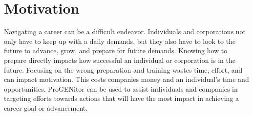 \section{Motivation}
\label{sect:motivation}
Navigating a career can be a difficult endeavor.  Individuals and corporations
not only have to keep up with a daily demands, but they also have to look to the
future to advance, grow, and prepare for future demands.  Knowing how to prepare
directly impacts how successful an individual or corporation is in the future. 
Focusing on the wrong preparation and training wastes time, effort, and can
impact motivation.  This costs companies money and an individual's time and
opportunities.  ProGENitor can be used to assist individuals and companies in
targeting efforts towards actions that will have the most impact in achieving a
career goal or advancement.
